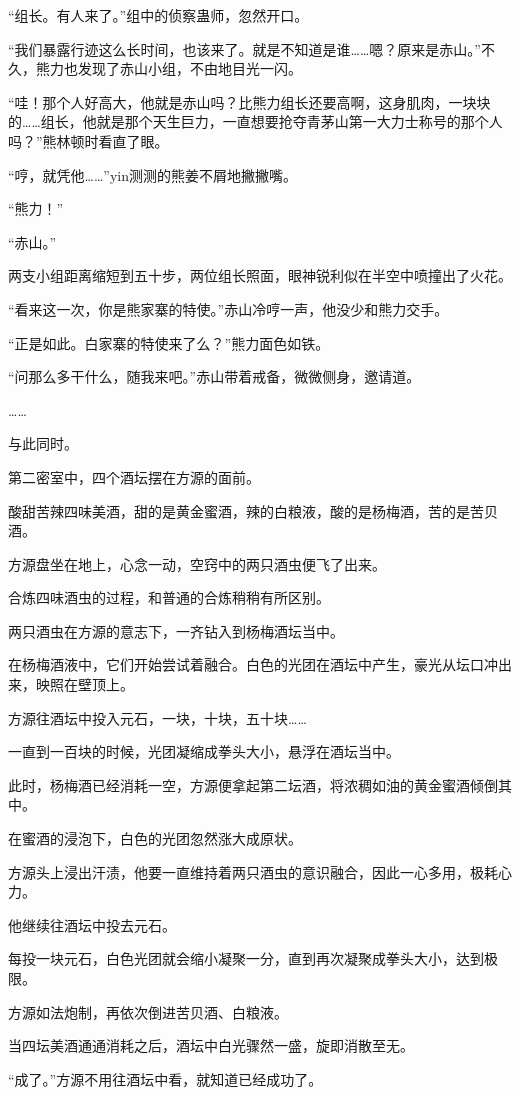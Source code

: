 \begin{this_body}
“组长。有人来了。”组中的侦察蛊师，忽然开口。

“我们暴露行迹这么长时间，也该来了。就是不知道是谁……嗯？原来是赤山。”不久，熊力也发现了赤山小组，不由地目光一闪。

“哇！那个人好高大，他就是赤山吗？比熊力组长还要高啊，这身肌肉，一块块的……组长，他就是那个天生巨力，一直想要抢夺青茅山第一大力士称号的那个人吗？”熊林顿时看直了眼。

“哼，就凭他……”yin测测的熊姜不屑地撇撇嘴。

“熊力！”

“赤山。”

两支小组距离缩短到五十步，两位组长照面，眼神锐利似在半空中喷撞出了火花。

“看来这一次，你是熊家寨的特使。”赤山冷哼一声，他没少和熊力交手。

“正是如此。白家寨的特使来了么？”熊力面色如铁。

“问那么多干什么，随我来吧。”赤山带着戒备，微微侧身，邀请道。

……

与此同时。

第二密室中，四个酒坛摆在方源的面前。

酸甜苦辣四味美酒，甜的是黄金蜜酒，辣的白粮液，酸的是杨梅酒，苦的是苦贝酒。

方源盘坐在地上，心念一动，空窍中的两只酒虫便飞了出来。

合炼四味酒虫的过程，和普通的合炼稍稍有所区别。

两只酒虫在方源的意志下，一齐钻入到杨梅酒坛当中。

在杨梅酒液中，它们开始尝试着融合。白色的光团在酒坛中产生，豪光从坛口冲出来，映照在壁顶上。

方源往酒坛中投入元石，一块，十块，五十块……

一直到一百块的时候，光团凝缩成拳头大小，悬浮在酒坛当中。

此时，杨梅酒已经消耗一空，方源便拿起第二坛酒，将浓稠如油的黄金蜜酒倾倒其中。

在蜜酒的浸泡下，白色的光团忽然涨大成原状。

方源头上浸出汗渍，他要一直维持着两只酒虫的意识融合，因此一心多用，极耗心力。

他继续往酒坛中投去元石。

每投一块元石，白色光团就会缩小凝聚一分，直到再次凝聚成拳头大小，达到极限。

方源如法炮制，再依次倒进苦贝酒、白粮液。

当四坛美酒通通消耗之后，酒坛中白光骤然一盛，旋即消散至无。

“成了。”方源不用往酒坛中看，就知道已经成功了。


\end{this_body}
